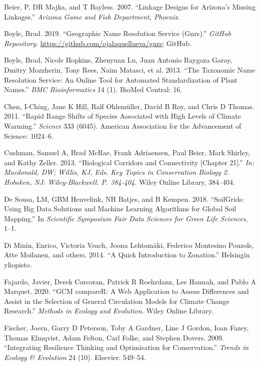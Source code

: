 \documentclass[]{article}
\begin{document}
\leavevmode\hypertarget{ref-beier2007linkage}{}%
Beier, P, DR Majka, and T Bayless. 2007. ``Linkage Designs for Arizona's Missing Linkages.'' \emph{Arizona Game and Fish Department, Phoenix}.

\leavevmode\hypertarget{ref-Boyle2019GNRS}{}%
Boyle, Brad. 2019. ``Geographic Name Resolution Service (Gnrs).'' \emph{GitHub Repository}. \url{https://github.com/ojalaquellueva/gnrs}; GitHub.

\leavevmode\hypertarget{ref-boyle2013taxonomic}{}%
Boyle, Brad, Nicole Hopkins, Zhenyuan Lu, Juan Antonio Raygoza Garay, Dmitry Mozzherin, Tony Rees, Naim Matasci, et al. 2013. ``The Taxonomic Name Resolution Service: An Online Tool for Automated Standardization of Plant Names.'' \emph{BMC Bioinformatics} 14 (1). BioMed Central: 16.

\leavevmode\hypertarget{ref-chen2011rapid}{}%
Chen, I-Ching, Jane K Hill, Ralf Ohlemüller, David B Roy, and Chris D Thomas. 2011. ``Rapid Range Shifts of Species Associated with High Levels of Climate Warming.'' \emph{Science} 333 (6045). American Association for the Advancement of Science: 1024--6.

\leavevmode\hypertarget{ref-cushman2013biological}{}%
Cushman, Samuel A, Brad McRae, Frank Adriaensen, Paul Beier, Mark Shirley, and Kathy Zeller. 2013. ``Biological Corridors and Connectivity {[}Chapter 21{]}.'' \emph{In: Macdonald, DW; Willis, KJ, Eds. Key Topics in Conservation Biology 2. Hoboken, NJ: Wiley-Blackwell. P. 384-404.} Wiley Online Library, 384--404.

\leavevmode\hypertarget{ref-de2018soilgrids}{}%
De Sousa, LM, GBM Heuvelink, NH Batjes, and B Kempen. 2018. ``SoilGrids: Using Big Data Solutions and Machine Learning Algorithms for Global Soil Mapping.'' In \emph{Scientific Symposium Fair Data Sciences for Green Life Sciences}, 1--1.

\leavevmode\hypertarget{ref-di2014quick}{}%
Di Minin, Enrico, Victoria Veach, Joona Lehtomäki, Federico Montesino Pouzols, Atte Moilanen, and others. 2014. ``A Quick Introduction to Zonation.'' Helsingin yliopisto.

\leavevmode\hypertarget{ref-fajardo_javier_2018_2669407}{}%
Fajardo, Javier, Derek Corcoran, Patrick R Roehrdanz, Lee Hannah, and Pablo A Marquet. 2020. ``GCM compareR: A Web Application to Assess Differences and Assist in the Selection of General Circulation Models for Climate Change Research.'' \emph{Methods in Ecology and Evolution}. Wiley Online Library.

\leavevmode\hypertarget{ref-fischer2009integrating}{}%
Fischer, Joern, Garry D Peterson, Toby A Gardner, Line J Gordon, Ioan Fazey, Thomas Elmqvist, Adam Felton, Carl Folke, and Stephen Dovers. 2009. ``Integrating Resilience Thinking and Optimisation for Conservation.'' \emph{Trends in Ecology \& Evolution} 24 (10). Elsevier: 549--54.
\end{document}
